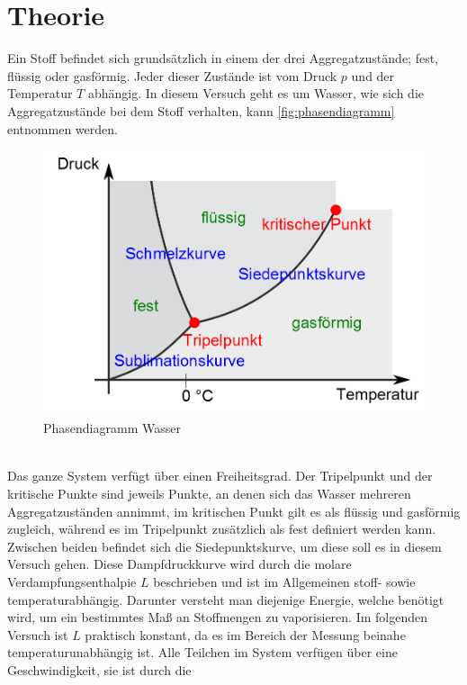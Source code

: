 \section{Theorie}
\label{sec:Theorie}

Ein Stoff befindet sich grundsätzlich in einem der drei Aggregatzustände;
fest, flüssig oder gasförmig. Jeder dieser Zustände ist vom Druck $p$ und
der Temperatur $T$ abhängig. In diesem Versuch geht es um Wasser, wie sich 
die Aggregatzustände bei dem Stoff verhalten, kann \autoref{fig:phasendiagramm}
entnommen werden. 
\begin{figure}[h]
    \centering
        \centering
        \includegraphics[width=\textwidth]{Bilder/aggregatzustand.png}
        \caption{Phasendiagramm Wasser \cite{phasendiagramm}}
    \hfill
    \label{fig:phasendiagramm}
\end{figure}
\\
Das ganze System verfügt über einen Freiheitsgrad.
Der Tripelpunkt und der kritische Punkte sind jeweils Punkte, an denen sich das 
Wasser mehreren Aggregatzuständen annimmt, im kritischen Punkt gilt es als
flüssig und gasförmig zugleich, während es im Tripelpunkt zusätzlich als fest 
definiert werden kann. Zwischen beiden befindet sich die Siedepunktskurve, um 
diese soll es in diesem Versuch gehen. Diese Dampfdruckkurve wird durch die 
molare Verdampfungsenthalpie $L$ beschrieben und ist im Allgemeinen stoff-
sowie temperaturabhängig. Darunter versteht man diejenige Energie, welche
benötigt wird, um ein bestimmtes Maß an Stoffmengen zu vaporisieren.
Im folgenden Versuch ist $L$ praktisch konstant, da es im Bereich der Messung
beinahe temperaturunabhängig ist.
Alle Teilchen im System verfügen über eine Geschwindigkeit, sie ist durch die 
